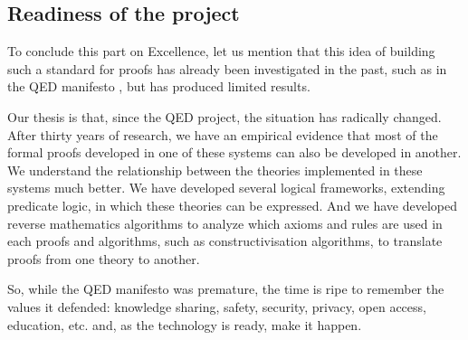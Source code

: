 \subsection{Readiness of the project}

To conclude this part on Excellence, let us mention that this idea of
building such a standard for proofs has already been investigated in
the past, such as in the QED manifesto \cite{Qed94}, but has produced
limited results.

Our thesis is that, since the QED project, the situation has radically
changed. After thirty years of research, we have an empirical evidence
that most of the formal proofs developed in one of these systems can
also be developed in another. We understand the relationship between
the theories implemented in these systems much better. We have
developed several logical frameworks, extending predicate logic, in
which these theories can be expressed. And we have developed reverse
mathematics algorithms to analyze which axioms and rules are used in
each proofs and algorithms, such as constructivisation algorithms, to
translate proofs from one theory to another.

So, while the QED manifesto was premature, the time is ripe to
remember the values it defended: knowledge sharing, safety, security,
privacy, open access, education, etc. and, as the technology is ready,
make it happen.

